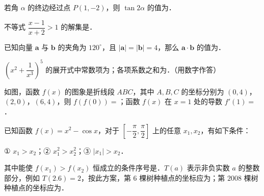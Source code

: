 \begin{question}
若角 $\alpha$ 的终边经过点 $P(1,-2)$，则 $\tan2\alpha$ 的值为\gkblank{}．

\end{question}
\begin{question}
不等式 $\dfrac{x-1}{x+2}>1$ 的解集是\gkblank{}．

\end{question}
\begin{question}
已知向量 $\boldsymbol a$ 与 $\boldsymbol b$ 的夹角为 $120^\circ$，且 $|\boldsymbol a|=|\boldsymbol b|=4$，那么 $\boldsymbol a\cdot\boldsymbol b$ 的值为\gkblank{}．

\end{question}
\begin{question}
$\left(x^2+\dfrac1{x^3}\right)^5$ 的展开式中常数项为\gkblank{}；各项系数之和为\gkblank{}．（用数字作答）

\Needspace{0.4\textheight}
\end{question}
\begin{question}
如图，函数 $f(x)$ 的图象是折线段 $ABC$，其中 $A,B,C$ 的坐标分别为 $(0,4)$，$(2,0)$，$(6,4)$，则 $f(f(0))=$\gkblank{}；函数 $f(x)$ 在 $x=1$ 处的导数 $f'(1)=$\gkblank{}．
\nopagebreak[4]
\begin{center}\end{center}
\nopagebreak[4]
\end{question}
\begin{question}
已知函数 $f(x)=x^2-\cos x$，对于 $\left[-\dfrac{\pi}{2},\dfrac{\pi}{2}\right]$ 上的任意 $x_1,x_2$，有如下条件：

① $x_1>x_2$；② $x_1^2>x_2^2$；③ $|x_1|>x_2$．

其中能使 $f(x_1)>f(x_2)$ 恒成立的条件序号是\gkblank{}．$T(a)$ 表示非负实数 $a$ 的整数部分，例如 $T(2.6)=2$，按此方案，第 $6$ 棵树种植点的坐标应为\gkblank{}；第 $2008$ 棵树种植点的坐标应为\gkblank{}．

\end{question}

